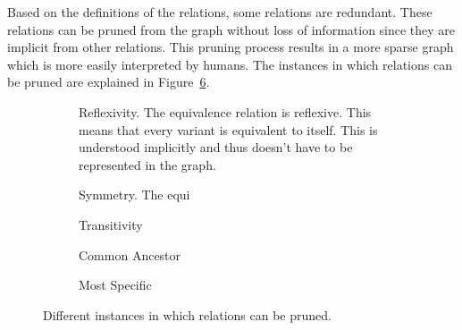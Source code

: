 Based on the definitions of the relations, some relations are redundant. 
These relations can be pruned from the graph without loss of information since they are implicit from other relations. 
This pruning process results in a more sparse graph which is more easily interpreted by humans.
The instances in which relations can be pruned are explained in Figure~\ref{fig:Pruning}.
%
%
\begin{figure}
    \newcommand{\subfigurelength}{0.35\textwidth} %
    \centering
    \begin{subfigure}{\subfigurelength}
        \centering
        
        \caption{Reflexivity. The equivalence relation is reflexive. This means that every variant is equivalent to itself. This is understood implicitly and thus doesn't have to be represented in the graph.}
        \label{sfig:Reflexivity}
    \end{subfigure}
    \begin{subfigure}{\subfigurelength}
        \centering
        
        \caption{Symmetry. The equi}
        \label{sfig:Symmetry}
    \end{subfigure}
    \begin{subfigure}{\subfigurelength}
        \centering
        
        \caption{Transitivity}
        \label{sfig:Transitivity}
    \end{subfigure}
    \begin{subfigure}{\subfigurelength}
        \centering
        
        \caption{Common Ancestor}
        \label{sfig:Common-Ancestor}
    \end{subfigure}
    \begin{subfigure}{\subfigurelength}
        \centering
        
        \caption{Most Specific}
        \label{sfig:Most-Specific}
    \end{subfigure}
    \caption{Different instances in which relations can be pruned.}
    \label{fig:Pruning}
\end{figure}

